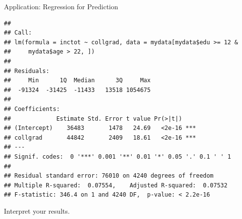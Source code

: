 \documentclass[
  ignorenonframetext,
]{beamer}
\newenvironment{Shaded}{\begin{snugshade}}{\end{snugshade}}
\newcommand{\DecValTok}[1]{\textcolor[rgb]{0.00,0.00,0.81}{#1}}
\newcommand{\KeywordTok}[1]{\textcolor[rgb]{0.13,0.29,0.53}{\textbf{#1}}}
\newcommand{\NormalTok}[1]{#1}
\newcommand{\OperatorTok}[1]{\textcolor[rgb]{0.81,0.36,0.00}{\textbf{#1}}}
\newcommand{\StringTok}[1]{\textcolor[rgb]{0.31,0.60,0.02}{#1}}
\begin{document}
\begin{frame}[fragile]{Application: Regression for Prediction}
\protect\hypertarget{application-regression-for-prediction-7}{}
\tiny

\begin{Shaded}
\end{Shaded}

\begin{verbatim}
## 
## Call:
## lm(formula = inctot ~ collgrad, data = mydata[mydata$edu >= 12 & 
##     mydata$age > 22, ])
## 
## Residuals:
##     Min      1Q  Median      3Q     Max 
##  -91324  -31425  -11433   13518 1054675 
## 
## Coefficients:
##             Estimate Std. Error t value Pr(>|t|)    
## (Intercept)    36483       1478   24.69   <2e-16 ***
## collgrad       44842       2409   18.61   <2e-16 ***
## ---
## Signif. codes:  0 '***' 0.001 '**' 0.01 '*' 0.05 '.' 0.1 ' ' 1
## 
## Residual standard error: 76010 on 4240 degrees of freedom
## Multiple R-squared:  0.07554,    Adjusted R-squared:  0.07532 
## F-statistic: 346.4 on 1 and 4240 DF,  p-value: < 2.2e-16
\end{verbatim}

\normalsize

Interpret your results.
\end{frame}
\end{document}
